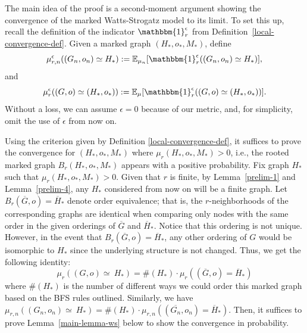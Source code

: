 \documentclass[10pt]{amsart}
\begin{document}
The main idea of the proof is a second-moment argument showing the convergence of the marked Watts-Strogatz model to its limit. To set this up, recall the definition of the indicator \(\mathbbm{1}_r^\epsilon\) from Definition~\ref{local-convergence-def}. Given a marked graph \((H_*, o_*, M_*)\), define
\begin{equation} \label{exp1} \mu_{r,n}^\epsilon((G_n,o_n)\simeq H_*) :=\mathbb{E}_{\mu_n}[\mathbbm{1}_r^\epsilon((G_n,o_n)\simeq H_*)],
\end{equation} 
and
\begin{equation} \label{exp2} \mu_{r}^\epsilon((G,o)\simeq (H_*,o_*)) :=\mathbb{E}_{\mu}[\mathbbm{1}_r^\epsilon((G, o)\simeq (H_*,o_*))].\end{equation} 
Without a loss, we can assume $\epsilon = 0$ because of our metric, and, for simplicity, omit the use of $\epsilon$ from now on.

Using the criterion given by Definition \ref{local-convergence-def}, it suffices to prove the convergence  for $(H_*, o_*, M_*)$  where  $\mu_r(H_*, o_*, M_*)>0$, i.e., the rooted marked graph $B_r(H_*, o_*, M_*)$ appears with a positive probability. Fix graph $H_*$ such that $\mu_r(H_*, o_*, M_*) > 0$. Given that $r$ is finite, by Lemma~\ref{prelim-1} and Lemma~\ref{prelim-4}, any $H_*$ considered from now on will be a finite graph. Let \(B_r(\overline{G}, o) = \overline{H}_*\) denote order equivalence; that is, the \(r\)-neighborhoods of the corresponding graphs are identical when comparing only nodes with the same order in the given orderings of \(\overline{G}\) and \(\overline{H}_*\). Notice that this ordering is not unique. However, in the event that $B_r(\overline{G}, o) = \overline{H}_*$, any other ordering of $G$ would be isomorphic to $H_*$ since the underlying structure is not changed. Thus, we get the following identity:
\begin{equation} \label{order-equivalence}
    \mu_r((G, o) \simeq\ H_*) =  \#(H_*) \cdot \mu_r((\overline{G}, o) = \overline{H}_*)
\end{equation}
where $\#(H_*)$ is the number of different ways we could order this marked graph based on the BFS rules outlined. Similarly, we have $\mu_{r,n}((G_n, o_n) \simeq\ H_*) =  \#(H_*) \cdot \mu_{r,n}((\overline{G_n}, o_n) = \overline{H}_*)$. Then, it suffices to prove Lemma~\ref{main-lemma-ws} below to show the convergence in probability.
\end{document}
